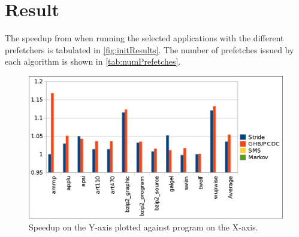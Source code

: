 
\section{Result}
\label{sec:result}

The speedup from when running the selected applications with the
different prefetchers is tabulated in \autoref{fig:initResults}. The
number of prefetches issued by each algorithm is shown in
\autoref{tab:numPrefetches}.

\begin{figure}[ht]
  \centering
  \includegraphics[scale=0.25]{figures/init_results.png}
  \caption{\label{fig:initResults} Speedup on the Y-axis plotted
    against program on the X-axis.}
\end{figure}

